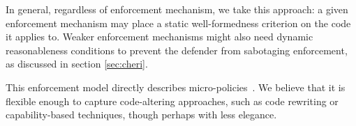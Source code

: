 \documentclass[acmsmall,review,anonymous]{acmart}\settopmatter{printfolios=true,printccs=false,printacmref=false}
\begin{document}
In general, regardless of enforcement mechanism, we take this approach:
a given enforcement mechanism may place a static well-formedness criterion
on the code it applies to. Weaker enforcement mechanisms might also need dynamic
reasonableness conditions to prevent the defender from sabotaging enforcement, as
discussed in section \ref{sec:cheri}.



This enforcement model directly describes micro-policies~\citep{pump_oakland2015}.
We believe that it is flexible enough to capture code-altering approaches, such as code
rewriting or capability-based techniques, though perhaps with less elegance.

\newcommand{\TAGS}{\mathcal{T}}
\newcommand{\tagname}{t}
\newcommand{\uP}{{\mu P}}
\end{document}

